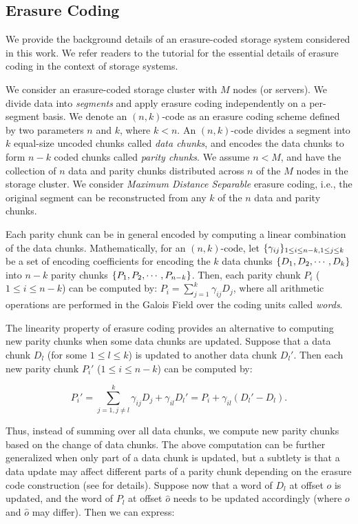 
\subsection{Erasure Coding}
\label{sec:ec_background}

We provide the background details of an erasure-coded storage system
considered in this work. We refer readers to the tutorial \cite{plank13} 
for the essential details of erasure coding in the context of storage systems. 

We consider an erasure-coded storage cluster with $M$ nodes (or servers).  We
divide data into {\em segments} and apply erasure coding independently on a
per-segment basis.  We denote an $(n,k)$-code as an erasure coding scheme
defined by two parameters $n$ and $k$, where $k<n$.  An $(n,k)$-code divides a
segment into $k$ equal-size uncoded chunks called {\em data chunks}, and
encodes the data chunks to form $n-k$ coded chunks called {\em parity chunks}.
We assume $n < M$, and have the collection of $n$ data and parity chunks
distributed across $n$ of the $M$ nodes in the storage cluster.  We consider
{\em Maximum Distance Separable} erasure coding, i.e., the original segment
can be reconstructed from any $k$ of the $n$ data and parity chunks. 

Each parity chunk can be in general encoded by computing a linear combination
of the data chunks.  Mathematically, for an $(n,k)$-code, let
$\lbrace \gamma_{ij} \rbrace_{1\le i\le n-k, 1\le j\le k}$ be a set of encoding
coefficients for encoding the $k$ data chunks $\lbrace D_1, D_2,\cdots,D_k \rbrace$ into
$n-k$ parity chunks $\lbrace P_1,P_2,\cdots,P_{n-k} \rbrace$.  Then, each parity chunk
$P_i$ ($1\le i\le n-k$) can be computed by:
$P_i = \sum_{j=1}^{k} \gamma_{ij} D_j$, 
where all arithmetic operations are performed in the Galois Field over the
coding units called {\em words}. 

The linearity property of erasure coding provides an alternative to computing
new parity chunks when some data chunks are updated.  Suppose that a data
chunk $D_l$ (for some $1\le l\le k$) is updated to another data chunk $D_l'$. 
Then each new parity chunk $P_i'$ ($1\le i\le n-k$) can be computed by:

\begin{equation*}
P_i' = \sum_{j=1,j\ne l}^{k} \gamma_{ij} D_j + \gamma_{il} D_l' 
= P_i + \gamma_{il}(D_l' - D_l). 
\end{equation*}

Thus, instead of summing over all data chunks, we compute new parity chunks
based on the change of data chunks.  The above computation can be further 
generalized when only part of a data chunk is updated, but a subtlety is that 
a data update may affect different parts of a parity chunk depending on the
erasure code construction (see \cite{plank13} for details).  Suppose now that
a word of $D_l$ at offset $o$ is updated, and the word of $P_l$ at offset
$\hat{o}$ needs to be updated accordingly (where $o$ and $\hat{o}$ may
differ).  Then we can express:

